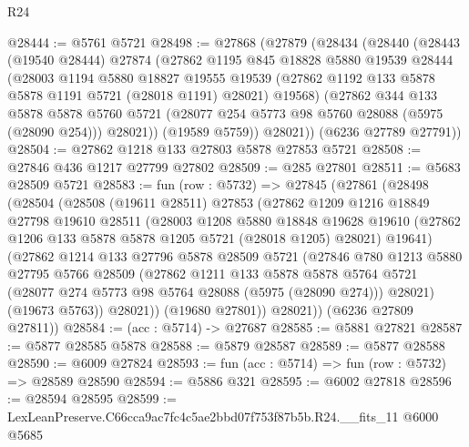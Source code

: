 \begin{lexlean}{R24}
\begin{coremodule}
@28444 := @5761 @5721
@28498 := @27868
    (@27879
      (@28434
        (@28440
          (@28443
            (@19540 @28444)
            @27874
            (@27862
              @1195
              @845
              @18828
              @5880
              @19539
              @28444
              (@28003
                @1194
                @5880
                @18827
                @19555
                @19539
                (@27862 @1192 @133 @5878 @5878 @1191 @5721 (@28018 @1191) @28021)
                @19568)
              (@27862
                @344
                @133
                @5878
                @5878
                @5760
                @5721
                (@28077 @254 @5773 @98 @5760 @28088 (@5975 (@28090 @254)))
                @28021))
            (@19589 @5759))
          @28021))
      (@6236 @27789 @27791))
@28504 := @27862 @1218 @133 @27803 @5878 @27853 @5721
@28508 := @27846 @436 @1217 @27799 @27802
@28509 := @285 @27801
@28511 := @5683 @28509 @5721
@28583 := fun (row : @5732) =>
  @27845
    (@27861
      (@28498
        (@28504
          (@28508
            (@19611 @28511)
            @27853
            (@27862
              @1209
              @1216
              @18849
              @27798
              @19610
              @28511
              (@28003
                @1208
                @5880
                @18848
                @19628
                @19610
                (@27862 @1206 @133 @5878 @5878 @1205 @5721 (@28018 @1205) @28021)
                @19641)
              (@27862
                @1214
                @133
                @27796
                @5878
                @28509
                @5721
                (@27846
                  @780
                  @1213
                  @5880
                  @27795
                  @5766
                  @28509
                  (@27862
                    @1211
                    @133
                    @5878
                    @5878
                    @5764
                    @5721
                    (@28077 @274 @5773 @98 @5764 @28088 (@5975 (@28090 @274)))
                    @28021)
                  (@19673 @5763))
                @28021))
            (@19680 @27801))
          @28021))
      (@6236 @27809 @27811))
@28584 := (acc : @5714) -> @27687
@28585 := @5881 @27821
@28587 := @5877 @28585 @5878
@28588 := @5879 @28587
@28589 := @5877 @28588
@28590 := @6009 @27824
@28593 := fun (acc : @5714) => fun (row : @5732) => @28589 @28590
@28594 := @5886 @321
@28595 := @6002 @27818
@28596 := @28594 @28595
@28599 := LexLeanPreserve.C66cca9ac7fc4c5ae2bbd07f753f87b5b.R24.__fits_11 @6000 @5685

\end{coremodule}
\end{lexlean}
